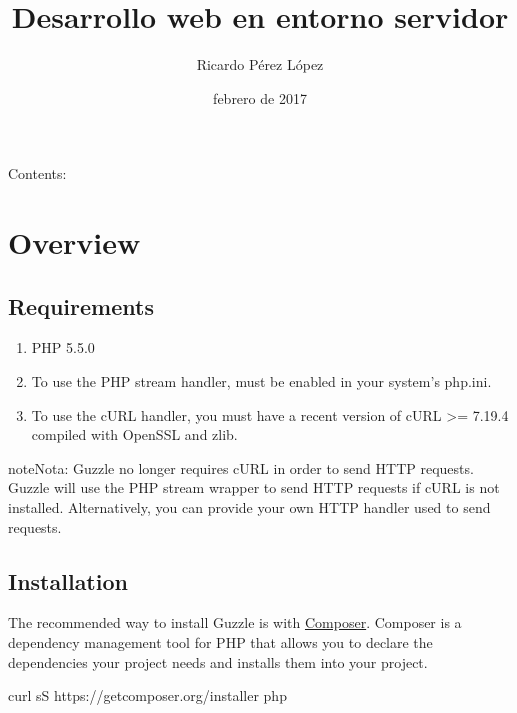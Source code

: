 \documentclass[a4paper,11pt,spanish]{sphinxmanual}
\title{Desarrollo web en entorno servidor}
\date{febrero de 2017}
\author{Ricardo Pérez López}
\begin{document}
\maketitle
\sphinxtableofcontents
{}\label{\detokenize{index::doc}}


Contents:


\part{Overview}
\label{\detokenize{overview:overview}}\label{\detokenize{overview::doc}}\label{\detokenize{overview:welcome-to-desarrollo-web-en-entorno-servidor-s-documentation}}

\chapter{Requirements}
\label{\detokenize{overview:requirements}}\begin{enumerate}
\item {} 
PHP 5.5.0

\item {} 
To use the PHP stream handler,  must be enabled in your
system's php.ini.

\item {} 
To use the cURL handler, you must have a recent version of cURL \textgreater{}= 7.19.4
compiled with OpenSSL and zlib.

\end{enumerate}

\begin{sphinxadmonition}{note}{Nota:}
Guzzle no longer requires cURL in order to send HTTP requests. Guzzle will
use the PHP stream wrapper to send HTTP requests if cURL is not installed.
Alternatively, you can provide your own HTTP handler used to send requests.
\end{sphinxadmonition}


\chapter{Installation}
\label{\detokenize{overview:installation}}\label{\detokenize{overview:id1}}
The recommended way to install Guzzle is with
\href{http://getcomposer.org}{Composer}. Composer is a dependency management tool
for PHP that allows you to declare the dependencies your project needs and
installs them into your project.

\begin{sphinxVerbatim}[commandchars=\\\{\}]
curl \PYGZhy{}sS https://getcomposer.org/installer  php
\end{sphinxVerbatim}
\end{document}
